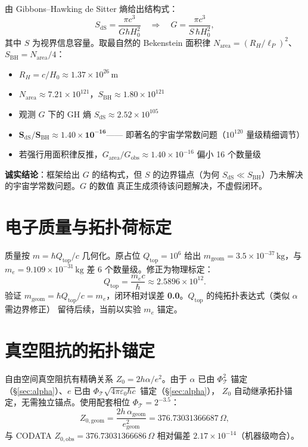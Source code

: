 \documentclass[11pt,a4paper]{article}
\begin{document}
由 Gibbons--Hawking de Sitter 熵给出结构式：
\begin{equation}
S_{\mathrm{dS}}=\frac{\pi c^3}{G\hbar H_0^2}
\quad\Longrightarrow\quad
\boxed{G=\frac{\pi c^3}{S\,\hbar H_0^2}},
\end{equation}
其中 $S$ 为视界信息容量。取最自然的 Bekenstein 面积律
$N_{\mathrm{area}}=(R_H/\ell_P)^2$、$S_{\mathrm{BH}}=N_{\mathrm{area}}/4$：
\begin{itemize}
\item $R_H=c/H_0\approx 1.37\times10^{26}\,\mathrm{m}$
\item $N_{\mathrm{area}}\approx 7.21\times10^{121}$，$S_{\mathrm{BH}}\approx 1.80\times10^{121}$
\item 观测 $G$ 下的 $\mathrm{GH}$ 熵 $S_{\mathrm{dS}}\approx 2.52\times10^{105}$
\item $\mathbf{S_{\mathrm{dS}}/S_{\mathrm{BH}}\approx 1.40\times10^{-16}}$——
即著名的宇宙学常数问题（$10^{120}$ 量级精细调节）
\item 若强行用面积律反推，$G_{\mathrm{area}}/G_{\mathrm{obs}}\approx 1.40\times10^{-16}$
偏小 16 个数量级
\end{itemize}
\textbf{诚实结论}：框架给出 $G$ 的结构式，但 $S$ 的边界锚点（为何
$S_{\mathrm{dS}}\ll S_{\mathrm{BH}}$）乃未解决的宇宙学常数问题。$G$ 的数值
真正生成须待该问题解决，不虚假闭环。

\section{电子质量与拓扑荷标定}
\label{sec:me}
质量按 $m=\hbar Q_{\mathrm{top}}/c$ 几何化。原占位 $Q_{\mathrm{top}}=10^6$
给出 $m_{\mathrm{geom}}=3.5\times10^{-37}\,\mathrm{kg}$，与
$m_e=9.109\times10^{-31}\,\mathrm{kg}$ 差 6 个数量级。修正为物理标定：
\begin{equation}
Q_{\mathrm{top}}=\frac{m_e c}{\hbar}\approx 2.5896\times10^{12}.
\end{equation}
验证 $m_{\mathrm{geom}}=\hbar Q_{\mathrm{top}}/c=m_e$，闭环相对误差
\textbf{0.0}。$Q_{\mathrm{top}}$ 的纯拓扑表达式（类似 $\alpha$ 需边界修正）
留待后续，当前以实验 $m_e$ 锚定。

\section{真空阻抗的拓扑锚定}
\label{sec:Z0}
自由空间真空阻抗有精确关系 $Z_0=2h\alpha/e^2$。由于 $\alpha$ 已由
$\Phi_{\mathcal T}^2$ 锚定（\S\ref{sec:alpha}）、$e$ 已由
$\Phi_{\mathcal T}\sqrt{4\pi\varepsilon_0\hbar c}$ 锚定（\S\ref{sec:alpha}），
$Z_0$ 自动继承拓扑锚定，无需独立锚点。使用配套相位 $\Phi_{\mathcal T}=2^{-3.5}$：
\begin{equation}
Z_{0,\mathrm{geom}}=\frac{2h\,\alpha_{\mathrm{geom}}}{e_{\mathrm{geom}}^2}
=376.73031366687\,\Omega,
\end{equation}
与 CODATA $Z_{0,\mathrm{obs}}=376.73031366686\,\Omega$ 相对偏差
\textbf{$2.17\times10^{-14}$}（机器级吻合）。
\end{document}
